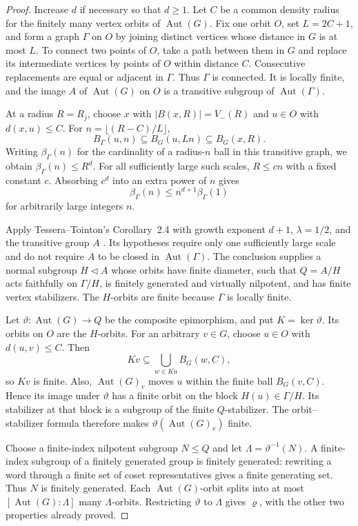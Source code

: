 \documentclass[11pt]{article}
\theoremstyle{definition}
\begin{document}
\begin{proof}
Increase $d$ if necessary so that $d\ge1$. Let $C$ be a common density
radius for the finitely many vertex orbits of $\operatorname{Aut}(G)$. Fix one orbit $O$, set $L=2C+1$, and form a
graph $\Gamma$ on $O$ by joining distinct vertices whose distance in $G$
is at most $L$. To connect two points of $O$, take a path between them
in $G$ and replace its intermediate vertices by points of $O$ within
distance $C$. Consecutive replacements are equal or adjacent in
$\Gamma$. Thus $\Gamma$ is connected. It is locally finite, and the
image $A$ of $\operatorname{Aut}(G)$ on $O$ is a transitive subgroup of
$\operatorname{Aut}(\Gamma)$.

At a radius $R=R_j$, choose $x$ with $|B(x,R)|=V_-(R)$ and $u\in O$
with $d(x,u)\le C$. For $n=\lfloor(R-C)/L\rfloor$,
\[
 B_\Gamma(u,n)\subseteq B_G(u,Ln)\subseteq B_G(x,R).
\]
Writing $\beta_\Gamma(n)$ for the cardinality of a radius-$n$ ball in
this transitive graph, we obtain $\beta_\Gamma(n)\le R^d$.
For all sufficiently large such scales, $R\le c n$ with a fixed
constant $c$. Absorbing $c^d$ into an extra power of $n$ gives
\[
 \beta_\Gamma(n)\le n^{d+1}\beta_\Gamma(1)
\]
for arbitrarily large integers $n$.

Apply Tessera--Tointon's Corollary~2.4 with growth exponent $d+1$,
$\lambda=1/2$, and the transitive group $A$
\cite[Corollary~2.4]{TesseraTointon2021}.
Its hypotheses require only one sufficiently large scale and do not
require $A$ to be closed in $\operatorname{Aut}(\Gamma)$.
The conclusion supplies a normal subgroup $H\lhd A$ whose orbits
have finite diameter, such that $Q=A/H$ acts faithfully on
$\Gamma/H$, is finitely generated and virtually nilpotent, and has
finite vertex stabilizers. The $H$-orbits are finite because $\Gamma$
is locally finite.

Let $\vartheta:\operatorname{Aut}(G)\to Q$ be the composite
epimorphism, and put $K=\ker\vartheta$. Its orbits on $O$ are the
$H$-orbits. For an arbitrary $v\in G$, choose $u\in O$ with
$d(u,v)\le C$. Then
\[
 Kv\subseteq\bigcup_{w\in Ku}B_G(w,C),
\]
so $Kv$ is finite. Also, $\operatorname{Aut}(G)_v$ moves $u$ within
the finite ball $B_G(v,C)$. Hence its image under $\vartheta$ has a
finite orbit on the block $H(u)\in\Gamma/H$. Its stabilizer at that
block is a subgroup of the finite $Q$-stabilizer. The orbit--stabilizer
formula therefore makes $\vartheta(\operatorname{Aut}(G)_v)$ finite.

Choose a finite-index nilpotent subgroup $N\le Q$ and let
$\Lambda=\vartheta^{-1}(N)$. A finite-index subgroup of a finitely
generated group is finitely generated: rewriting a word through a
finite set of coset representatives gives a finite generating set.
Thus $N$ is finitely generated. Each $\operatorname{Aut}(G)$-orbit
splits into at most $[\operatorname{Aut}(G):\Lambda]$ many
$\Lambda$-orbits. Restricting $\vartheta$ to $\Lambda$ gives
$\varrho$, with the other two properties already proved.
\end{proof}
\end{document}
